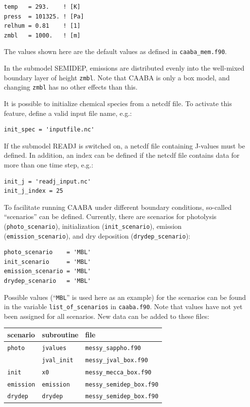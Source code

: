 \documentclass[twoside]{article}
\begin{document}
\begin{verbatim}
temp   = 293.    ! [K]
press  = 101325. ! [Pa]
relhum = 0.81    ! [1]
zmbl   = 1000.   ! [m]
\end{verbatim}

The values shown here are the default values as defined in
\verb|caaba_mem.f90|.

In the submodel SEMIDEP, emissions are distributed evenly into the
well-mixed boundary layer of height \verb|zmbl|. Note that CAABA is only
a box model, and changing \verb|zmbl| has no other effects than this.

It is possible to initialize chemical species from a netcdf file. To
activate this feature, define a valid input file name, e.g.:

\begin{verbatim}
init_spec = 'inputfile.nc'
\end{verbatim}

If the submodel READJ is switched on, a netcdf file containing J-values
must be defined. In addition, an index can be defined if the netcdf file
contains data for more than one time step, e.g.:

\begin{verbatim}
init_j = 'readj_input.nc'
init_j_index = 25
\end{verbatim}

To facilitate running CAABA under different boundary conditions,
so-called ``scenarios'' can be defined. Currently, there are scenarios
for photolysis (\verb|photo_scenario|), initialization
(\verb|init_scenario|), emission (\verb|emission_scenario|), and dry
deposition (\verb|drydep_scenario|):

\begin{verbatim}
photo_scenario    = 'MBL'
init_scenario     = 'MBL'
emission_scenario = 'MBL'
drydep_scenario   = 'MBL'
\end{verbatim}

Possible values (``\verb|MBL|'' is used here as an example) for the
scenarios can be found in the variable \verb|list_of_scenarios| in
\verb|caaba.f90|. Note that values have not yet been assigned for all
scenarios. New data can be added to these files:

\begin{center}  
  \begin{tabular}{lll}
    \hline
    scenario & subroutine & file\\
    \hline
    \verb|photo|    & \verb|jvalues| & \verb|messy_sappho.f90|\\
                    & \verb|jval_init| & \verb|messy_jval_box.f90|\\
    \verb|init|     & \verb|x0| & \verb|messy_mecca_box.f90|\\
    \verb|emission| & \verb|emission| & \verb|messy_semidep_box.f90|\\
    \verb|drydep|   & \verb|drydep| & \verb|messy_semidep_box.f90|\\
    \hline
  \end{tabular}
\end{center}
\end{document}
